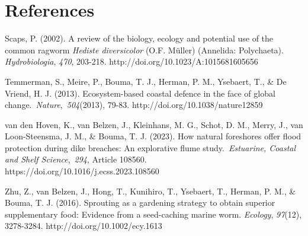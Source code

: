 \documentclass[authordate, anecdote]{jote-new-article}
\begin{document}
	\section{References}



	Scaps, P. (2002). A review of the biology, ecology and potential use of the common ragworm \emph{Hediste diversicolor }(O.F. Müller) (Annelida: Polychaeta). \emph{Hydrobiologia}, \emph{470}, 203-218. http://doi.org/10.1023/A:1015681605656



	Temmerman, S., Meire, P., Bouma, T. J., Herman, P. M., Ysebaert, T., \& De Vriend, H. J. (2013). Ecosystem-based coastal defence in the face of global change. \emph{Nature}, \emph{504}(2013), 79-83. http://doi.org/10.1038/nature12859



	van den Hoven, K., van Belzen, J., Kleinhans, M. G., Schot, D. M., Merry, J., van Loon-Steensma, J. M., \& Bouma, T. J. (2023). How natural foreshores offer flood protection during dike breaches: An explorative flume study. \emph{Estuarine, Coastal and Shelf Science}, \emph{294}, Article 108560. https://doi.org/10.1016/j.ecss.2023.108560



	Zhu, Z., van Belzen, J., Hong, T., Kunihiro, T., Ysebaert, T., Herman, P. M., \& Bouma, T. J. (2016). Sprouting as a gardening strategy to obtain superior supplementary food: Evidence from a seed-caching marine worm. \emph{Ecology}, \emph{97}(12), 3278-3284. http://doi.org/10.1002/ecy.1613
\end{document}
